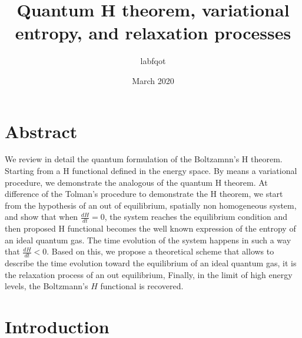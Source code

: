 \documentclass{article}
\title{Quantum H theorem, variational entropy, and relaxation processes}
\author{labfqot}
\date{March 2020}
\begin{document}
\maketitle

\section*{Abstract}
We review in detail the quantum formulation of the Boltzamnn's H theorem. Starting from a H functional defined in the energy space. By means a variational procedure, we demonstrate the analogous of the quantum H theorem. At difference of the Tolman's procedure to demonstrate the H theorem,  we start from the hypothesis of an out of equilibrium, spatially non homogeneous system, and show that when $\frac{dH}{dt}=0$, the system reaches the equilibrium condition and then proposed H functional becomes the well known expression of the entropy of an ideal quantum gas. The time evolution of the system happens in such a way that $\frac{dH}{dt}<0$. Based on this, we propose a theoretical scheme that allows to describe the time evolution toward the equilibrium of an ideal quantum gas, it is the relaxation process of an out equilibrium, Finally, in the limit of high energy levels, the Boltzmann's $H$ functional is recovered.







\section{Introduction}
\end{document}
